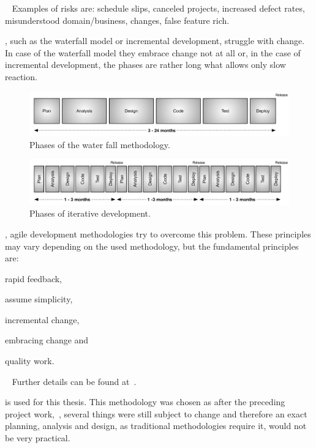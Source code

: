 \documentclass[%
    a4paper,    %
    justified,  %
    nobib,      %
    openany     %
]{tufte-book}
\makeatletter
\renewcommand{\label}[1]{\@tufte@label{##1}}%
\makeatother
\begin{document}
~\cite{beck-xp-2004} Examples of risks are: schedule slips,
canceled projects, increased defect rates, misunderstood domain/business,
changes, false feature rich.~\cite{beck-xp-2004}

, such as the
waterfall model or incremental development, struggle with change. In case of the
waterfall model they embrace change not at all or, in the case of incremental
development, the phases are rather long what allows only slow reaction.

\begin{figure}[ht]
  \includegraphics[width=0.95\linewidth]{images/waterfall}
  \caption{Phases of the water fall methodology.~\cite[p. 16]{shore-aad-2007}}
  \label{fig:waterfall}
\end{figure}

\begin{figure}[ht]
  \includegraphics[width=0.95\linewidth]{images/iterative-dev}
  \caption{Phases of iterative development.~\cite[p. 16]{shore-aad-2007}}
  \label{fig:iterative-dev}
\end{figure}

, agile development methodologies try
to overcome this problem. These principles may vary depending on the used
methodology, but the fundamental principles are:
\begin{enumerate*}
  \item rapid feedback,
  \item assume simplicity,
  \item incremental change,
  \item embracing change and
  \item quality work.
\end{enumerate*}~\cite{beck-xp-2004}
Further details can be found at~\cite{beck-xp-2004, shore-aad-2007}.

 is used for this thesis.
This methodology was chosen as after the preceding project
work,~, several things were still subject to
change and therefore an exact planning, analysis and design, as traditional
methodologies require it, would not be very practical.
\end{document}
